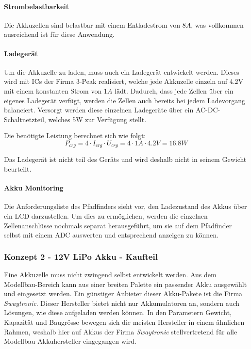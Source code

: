 \documentclass[main.tex]{subfiles} %
\begin{document}
\paragraph{Strombelastbarkeit}
Die Akkuzellen sind belastbar mit einem Entladestrom von $8A$, was vollkommen
ausreichend ist für diese Anwendung.

\paragraph{Ladegerät}
Um die Akkuzelle zu laden, muss auch ein Ladegerät entwickelt werden. Dieses
wird mit ICs der Firma 3-Peak realisiert, welche jede Akkuzelle einzeln auf
4.2V mit einem konstanten Strom von $1A$ lädt. Dadurch, dass jede Zellen über
ein eigenes Ladegerät verfügt, werden die Zellen auch bereits bei jedem
Ladevorgang balanciert. Versorgt werden diese einzelnen Ladegeräte über ein
AC-DC-Schaltnetzteil, welches 5W zur Verfügung stellt.

Die benötigte Leistung berechnet sich wie folgt:
\[
    P_{crg} = 4 \cdot I_{crg} \cdot U_{crg} =  4 \cdot 1A \cdot 4.2V = 16.8W
\]

Das Ladegerät ist nicht teil des Geräts und wird deshalb nicht in seinem
Gewicht beurteilt.

\paragraph{Akku Monitoring}
Die Anforderungsliste des Pfadfinders sieht vor, den Ladezustand des Akkus über
ein LCD darzustellen. Um dies zu ermöglichen, werden die einzelnen
Zellenanschlüsse nochmals separat herausgeführt, um sie auf dem Pfadfinder
selbst mit einem ADC auswerten und entsprechend anzeigen zu können.

\subsubsection*{Konzept 2 - 12V LiPo Akku - Kaufteil}

Eine Akkuzelle muss nicht zwingend selbst entwickelt werden. Aus dem
Modellbau-Bereich kann aus einer breiten Palette ein passender Akku ausgewählt
und eingesetzt werden. Ein günstiger Anbieter dieser Akku-Pakete ist die Firma
\textit{Swaytronic}. Dieser Hersteller bietet nicht nur Akkumulatoren an,
sondern auch Lösungen, wie diese aufgeladen werden können. In den Parametern
Gewicht, Kapazität und Baugrösse bewegen sich die meisten Hersteller in einem
ähnlichen Rahmen, weshalb hier auf Akkus der Firma \textit{Swaytronic}
stellvertretend für alle Modellbau-Akkuhersteller eingegangen wird.
\end{document}
